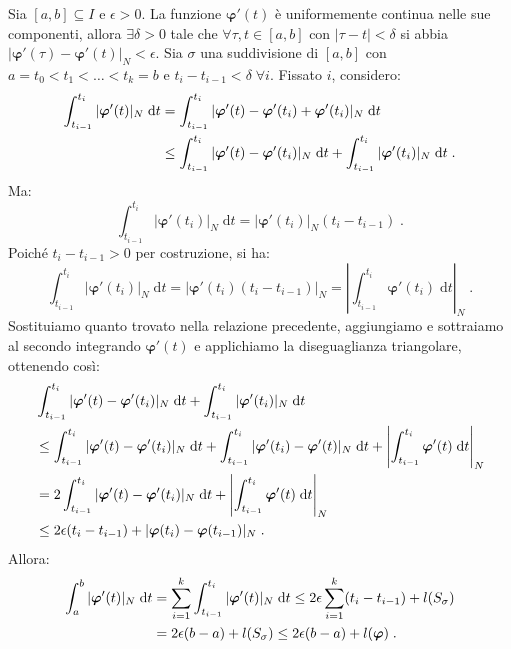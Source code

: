 \documentclass[a4paper,12pt]{report}
\theoremstyle{plain}
\theoremstyle{definition}
\theoremstyle{remark}
\newcommand{\BF}[1]{\boldsymbol{#1}}
\newcommand{\diff}[1]{\mathrm{d}#1}
\numberwithin{equation}{section}
\begin{document}
Sia $[a,b]\subseteq I$ e $\epsilon>0$. La funzione $\boldsymbol{\varphi}'(t)$ è uniformemente continua nelle sue componenti, allora $
\exists\delta>0$ tale che $\forall \tau,t\in[a,b]$ con $|\tau-t|<\delta$ si abbia $|\boldsymbol{\varphi}'(\tau)-\boldsymbol{\varphi}'(t)|_
N<\epsilon$. Sia $\sigma$ una suddivisione di $[a,b]$ con $a=t_0<t_1<\ldots<t_k=b$ e $t_i-t_{i-1}<\delta\;\forall i$. Fissato $i$, considero:
\begin{align}
\int_{t_{i-1}}^{t_i} |\BF{\varphi}'(t)|_N\;\diff{t} &= \int_{t_{i-1}}^{t_i} |\BF{\varphi}'(t)-\BF{\varphi}'(t_i)+\BF{\varphi}'(t_i)|_N\;\diff{t} \notag \\
&\le \int_{t_{i-1}}^{t_i}|\BF{\varphi}'(t)-\BF{\varphi}'(t_i)|_N\;\diff{t}+\int_{t_{i-1}}^{t_i}|\BF{\varphi}'(t_i)|_N\;\diff{t}\;.
\end{align}
Ma:
\begin{equation}
\int_{t_{i-1}}^{t_i} |\boldsymbol{\varphi}'(t_i)|_N\;\diff{t}=|\boldsymbol{\varphi}'(t_i)|_N(t_i-t_{i-1})\;.
\end{equation}
Poiché $t_i-t_{i-1}>0$ per costruzione, si ha:
\begin{equation}
\int_{t_{i-1}}^{t_i}|\BF{\varphi}'(t_i)|_N\;\diff{t}=|\boldsymbol{\varphi}'(t_i)(t_i-t_{i-1})|_N=\left|\int_{t_{i-1}}^{t_i}\boldsymbol{\varphi}'(t_i)\;\diff{t}\right|_N\;.
\end{equation}
Sostituiamo quanto trovato nella relazione precedente, aggiungiamo e sottraiamo al secondo integrando $\boldsymbol{\varphi}'(t)$ e 
applichiamo la diseguaglianza triangolare, ottenendo così:
\begin{align}
&\int_{t_{i-1}}^{t_i}|\BF{\varphi}'(t)-\BF{\varphi}'(t_i)|_N\;\diff{t}+\int_{t_{i-1}}^{t_i}|\BF{\varphi}'(t_i)|_N\;\diff{t} \notag \\
&\le \int_{t_{i-1}}^{t_i}|\BF{\varphi}'(t)-\BF{\varphi}'(t_i)|_N\;\diff{t}+\int_{t_{i-1}}^{t_i}|\BF{\varphi}'(t_i)-\BF{\varphi}'(t)|_N\;\diff{t}+\left|\int_{t_{i-1}}^{t_i}\BF{\varphi}'(t)\;\diff{t}\right|_N\notag \\
&=2\int_{t_{i-1}}^{t_i}|\BF{\varphi}'(t)-\BF{\varphi}'(t_i)|_N\;\diff{t}+\left|\int_{t_{i-1}}^{t_i}\BF{\varphi}'(t)\;\diff{t}\right|_N\notag \\
&\le 2\epsilon(t_i-t_{i-1})+|\BF{\varphi}(t_i)-\BF{\varphi}(t_{i-1})|_N\;.
\end{align}
Allora:
\begin{align}
\int_a^b |\BF{\varphi}'(t)|_N\;\diff{t}&=\sum_{i=1}^k\int_{t_{i-1}}^{t_i}|\BF{\varphi}'(t)|_N\;\diff{t}\le 2\epsilon\sum_{i=1}^k (t_i-t_{i-1})+l(S_{\sigma}) \notag \\
&=2\epsilon(b-a)+l(S_{\sigma})\le 2\epsilon(b-a)+l(\BF{\varphi})\;.
\end{align}
\end{document}
